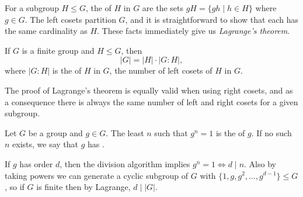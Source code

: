 \documentclass[a4paper]{scrartcl}
\begin{document}
For a subgroup $H \leq G$, the  of $H$ in $G$ are the sets $gH = \{gh \mid h \in H \}$ where $g \in G$. 
The left cosets partition $G$, and it is straightforward to show that each has the same cardinality as $H$. 
These facts immediately give us \emph{Lagrange's theorem}.

\begin{theorem}
  If $G$ is a finite group and $H \leq G$, then
  $$
|G| = |H| \cdot |G : H|,
  $$
  where $|G:H|$ is the  of $H$ in $G$, the number of left cosets of $H$ in $G$.
\end{theorem}

\begin{remark}
  The proof of Lagrange's theorem is equally valid when using right cosets, and as a consequence there is always the same number of left and right cosets for a given subgroup.
\end{remark}




\begin{definition}
	Let $G$ be a group and $g \in G$. 
  The least $n$ such that $g^n = 1$ is the  of $g$. If no such $n$ exists, we say that $g$ has .
\end{definition}

\begin{remark} 
If $g$ has order $d$, then the division algorithm implies $g^n = 1 \iff d \mid n$. Also by taking powers we can generate a cyclic subgroup of $G$ with $\{1, g, g^2, \dots, g^{d - 1}\} \leq G$, so if $G$ is finite then by Lagrange, $d \mid |G|$.
\end{remark}


\end{document}
